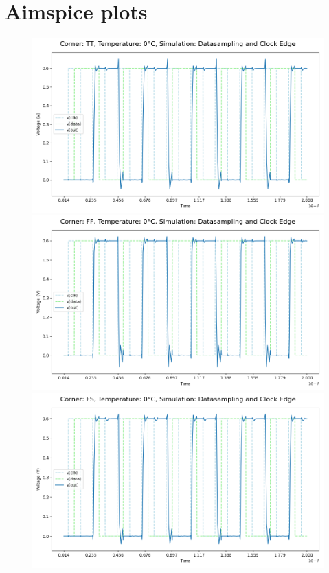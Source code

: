 \section{Aimspice plots} 


\begin{figure}[H]
    \centering
    \includegraphics[height= 0.21\textheight]{figures/aimspice/TT/0/W1.csv.png}
    \vspace{5pt}
    \includegraphics[height= 0.21\textheight]{figures/aimspice/FF/0/W1.csv.png}
    \vspace{5pt}
    \includegraphics[height= 0.21\textheight]{figures/aimspice/FS/0/W1.csv.png}

\end{figure}
